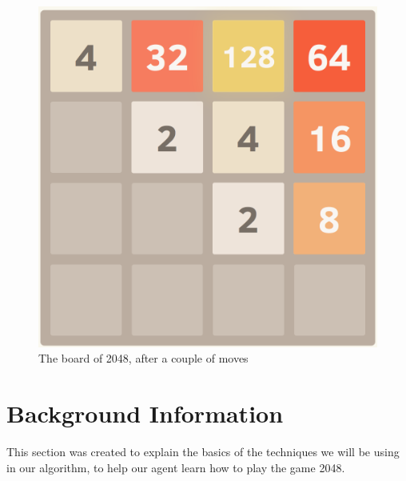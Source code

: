 \documentclass[a4paper,12pt]{article}
\begin{document}
\begin{figure}[t]
\centering
\includegraphics[scale=0.35]{img/2048board}
\caption{The board of 2048, after a couple of moves}
\label{fig:2048}
\end{figure}
\section{Background Information}
This section was created to explain the basics of the techniques we will be using in our algorithm, to help our agent learn how to play the game 2048. 
\end{document}
